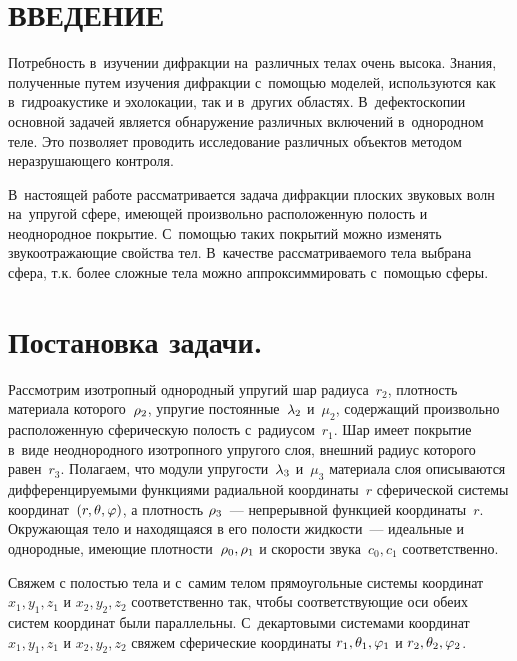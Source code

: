 

\renewcommand{\bibname}{СПИСОК ИСПОЛЬЗОВАННЫХ ИСТОЧНИКОВ}
\renewcommand\refname{СПИСОК ИСПОЛЬЗОВАННЫХ ИСТОЧНИКОВ}

%

\setcounter{page}{5}
\thispagestyle {empty}
\renewcommand{\contentsname}{\centering СОДЕРЖАНИЕ}
\tableofcontents

\newpage
\section*{ВВЕДЕНИЕ}
Потребность в~изучении дифракции на~различных телах очень высока. Знания, полученные путем изучения дифракции с~помощью моделей, используются как в~гидроакустике и эхолокации, так и в~других областях. В~дефектоскопии основной задачей является обнаружение различных включений в~однородном теле. Это позволяет проводить исследование различных объектов методом неразрушающего контроля.

В~настоящей работе рассматривается задача дифракции плоских звуковых волн на~упругой сфере, имеющей произвольно расположенную полость и неоднородное покрытие. С~помощью таких покрытий можно изменять звукоотражающие свойства тел. В~качестве рассматриваемого тела выбрана сфера, т.к. более сложные тела можно аппроксиммировать с~помощью сферы. 


\newpage

\section{Постановка задачи.} Рассмотрим изотропный однородный упругий шар радиуса~$r_2$, плотность материала которого~$\rho_2$, упругие постоянные~$\lambda_2$ и~$\mu_2$, содержащий произвольно расположенную сферическую полость с~радиусом~$r_1$. Шар имеет покрытие в~виде неоднородного изотропного упругого слоя, внешний радиус которого равен~$r_3$. Полагаем, что модули упругости~$\lambda_3$ и~$\mu_3$ материала слоя описываются дифференцируемыми функциями радиальной координаты~$r$ сферической системы координат~$(r, \theta, \varphi)$, а плотность $\rho_3$~--- непрерывной функцией координаты~$r$.  Окружающая тело и находящаяся в его полости жидкости~--- идеальные и однородные, имеющие плотности~$\rho_0, \rho_1$ и скорости звука~$c_0, c_1$ соответственно. 

Свяжем с полостью тела и с~самим телом прямоугольные системы координат $x_1, y_1, z_1$ и $x_2, y_2, z_2$ соответственно так, чтобы соответствующие оси обеих систем координат были параллельны. С~декартовыми системами координат $x_1, y_1, z_1$ и $x_2, y_2, z_2$ свяжем сферические координаты $r_1, \theta_1, \varphi_1$ и $r_2, \theta_2, \varphi_2$.

